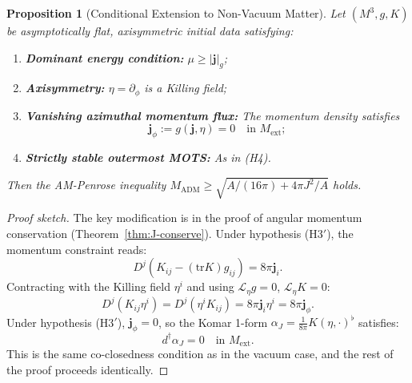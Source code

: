 \documentclass[12pt]{article}
\theoremstyle{plain}
\newtheorem{proposition}[theorem]{Proposition}
\theoremstyle{definition}
\theoremstyle{remark}
\newcommand{\ADM}{\mathrm{ADM}}
\newcommand{\tr}{\mathrm{tr}}
\newcommand{\momdens}{\boldsymbol{j}}
\begin{document}
\begin{proposition}[Conditional Extension to Non-Vacuum Matter]\label{prop:non-vacuum-extension}
Let $(M^3, g, K)$ be asymptotically flat, axisymmetric initial data satisfying:
\begin{enumerate}[label=\textup{(H\arabic*$'$)}]
    \item \textbf{Dominant energy condition:} $\mu \geq |\momdens|_g$;
    \item \textbf{Axisymmetry:} $\eta = \partial_\phi$ is a Killing field;
    \item \textbf{Vanishing azimuthal momentum flux:} The momentum density satisfies 
    \begin{equation}\label{eq:no-j-phi}
    \momdens_\phi := g(\momdens, \eta) = 0 \quad \text{in } M_{\mathrm{ext}};
    \end{equation}
    \item \textbf{Strictly stable outermost MOTS:} As in (H4).
\end{enumerate}
Then the AM-Penrose inequality $M_{\ADM} \geq \sqrt{A/(16\pi) + 4\pi J^2/A}$ holds.
\end{proposition}

\begin{proof}[Proof sketch]
The key modification is in the proof of angular momentum conservation (Theorem~\ref{thm:J-conserve}). Under hypothesis (H3$'$), the momentum constraint reads:
\[
D^j(K_{ij} - (\tr K)g_{ij}) = 8\pi \momdens_i.
\]
Contracting with the Killing field $\eta^i$ and using $\mathcal{L}_\eta g = 0$, $\mathcal{L}_\eta K = 0$:
\[
D^j(K_{ij}\eta^i) = D^j(\eta^i K_{ij}) = 8\pi \momdens_i \eta^i = 8\pi \momdens_\phi.
\]
Under hypothesis (H3$'$), $\momdens_\phi = 0$, so the Komar 1-form $\alpha_J = \frac{1}{8\pi}K(\eta, \cdot)^\flat$ satisfies:
\[
d^\dagger \alpha_J = 0 \quad \text{in } M_{\mathrm{ext}}.
\]
This is the same co-closedness condition as in the vacuum case, and the rest of the proof proceeds identically.
\end{proof}
\end{document}
